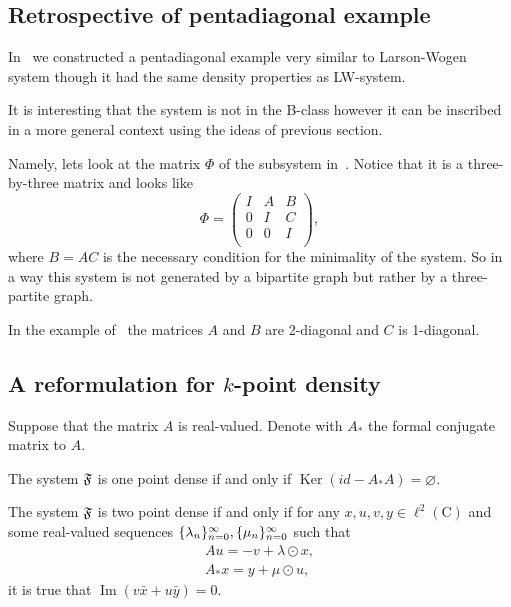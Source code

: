 \documentclass[12pt]{amsart}
\theoremstyle{case}
\begin{document}
  \subsection{Retrospective of pentadiagonal example}
    In~\cite{me2} we constructed a pentadiagonal example very similar to Larson-Wogen system though
      it had the same density properties as LW-system.

    It is interesting that the system is not in the B-class however it can be inscribed in a more
      general context using the ideas of previous section.

    Namely, lets look at the matrix $\Phi$ of the subsystem in~\cite{me2}.
    Notice that it is a three-by-three matrix and looks like
    \[
      \Phi = \left( {
        \begin{array}{ccc}
           I & A & B\\
           0 & I & C\\
           0 & 0 & I\\
        \end{array}
        }
      \right),
    \]
    where $B = AC$ is the necessary condition for the minimality of the system.
    So in a way this system is not generated by a bipartite graph but rather by a three-partite graph.

    In the example of~\cite{me2} the matrices $A$ and $B$ are 2-diagonal and $C$ is 1-diagonal.

  \subsection{A reformulation for $k$-point density}
  Suppose that the matrix $A$ is real-valued.
  Denote with $A_*$ the formal conjugate matrix to $A$.
  \begin{prop}
    The system $\mathfrak{F}$ is one point dense if and only if $\operatorname{Ker}(id - A_* A) = \varnothing$.
  \end{prop}
  \begin{prop}
    The system $\mathfrak{F}$ is two point dense if and only if for any $x, u, v, y \in \ell^2(\mathrm{C})$
    and some real-valued sequences $\{{\lambda}_n\}_{n=0}^\infty, \{{\mu}_n\}_{n=0}^\infty$ such that
    \begin{align*}
      Au=-v + \lambda \odot x,\\
      A_*x = y + \mu \odot u,
    \end{align*}
    it is true that $\operatorname{Im}(v \bar{x} + u \bar{y}) = 0$.
  \end{prop}
\end{document}
